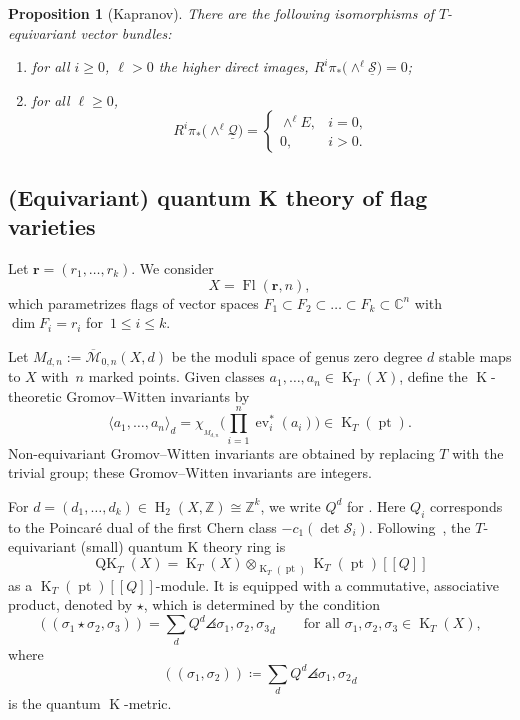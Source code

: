 \documentclass[11pt]{article}
\numberwithin{equation}{section}
\numberwithin{equation}{section}
\newtheorem{Proposition}[Theorem]{Proposition}
\theoremstyle{definition}
\DeclareMathOperator{\Fl}{Fl}
\DeclareMathOperator{\QK}{QK}
\DeclareMathOperator{\K}{K}
\DeclareMathOperator{\HH}{H}
\DeclareMathOperator{\pt}{pt}
\DeclarePairedDelimiter{\angles}{\langle}{\rangle}
\newcommand{\bfr}{{\mathbf r}}
\newcommand{\C}{{\mathbb C}}
\newcommand{\Z}{{\mathbb Z}}
\newcommand{\cQ}{{\mathcal Q}}
\newcommand{\cS}{{\mathcal S}}
\newcommand{\gw}[2]{\angles{ #1 }^{\mbox{}}_{#2}}
\newcommand{\euler}[1]{\chi_{_{#1}}}
\DeclareMathOperator{\ev}{ev}
\newcommand{\wb}{\overline}
\newcommand{\Mb}{\wb{\mathcal M}}
\begin{document}
\begin{Proposition}[Kapranov]\label{prop:relativeBWB}
 There are the following isomorphisms of $T$-equivariant vector bundles:
 \begin{enumerate}\itemsep=0pt
 \item[$(1)$] for all $i \ge 0$, $\ell>0$ the higher direct images, $R^i \pi_* \bigl(\wedge^\ell\underline{\cS}\bigr) = 0$;
 \item[$(2)$] for all $\ell\geq 0$, \[ R^i \pi_*\bigl(\wedge^\ell\underline{\cQ}\bigr) = \begin{cases} \wedge^\ell E, & i=0, \\ 0, & i>0 . \end{cases}\]
 \end{enumerate}
 \end{Proposition}

\subsection{(Equivariant) quantum K theory of flag varieties}\label{sec:prelim}
Let $\mathbf{r}= (r_1, \dots, r_k)$. We consider \[X=\Fl(\bfr,n),\] which parametrizes flags of vector spaces
$F_{1} \subset F_{2} \subset \dots \subset F_{k} \subset \C^n$
with $\dim F_{i} = r_i$ for~${1 \le i \le k}$.

Let $M_{d,n} := \Mb_{0,n}(X,d)$ be the moduli space of genus zero degree
$d$ stable maps to $X$ with~$n$ marked points. Given classes
$a_1, \dots, a_n \in \K_T(X)$,
define the $\K$-theoretic Gromov--Witten invariants by
\[ \langle a_1, \dots, a_n \rangle_{d} =
\euler{M_{d,n}}\Biggl(\prod_{i = 1}^n\ev_i^*(a_i)\Biggr)\in \K_T(\pt) . \]
Non-equivariant Gromov--Witten invariants are obtained by replacing $T$ with the
trivial group; these Gromov--Witten invariants are integers.

For $d=(d_1,\dots,d_k)\in\HH_2(X,\Z)\cong\Z^k$, we write $Q^d$ for . Here $Q_i$ corresponds to the Poincar{\'e} dual of the first Chern class $-c_1(\det \cS_i)$. Following~\cite{givental:onwdvv,lee:QK}, the $T$-equivariant (small) quantum
K theory ring is
\begin{equation*}%
\QK_T(X) = \K_T(X) \otimes_{\K_T(\pt)} \K_T(\pt)[\![Q]\!]
\end{equation*}
as a $\K_T(\pt)[\![Q]\!]$-module.
It is equipped with a commutative, associative
product, denoted by $\star$, which is
determined by the condition
\begin{equation*}%
 (\!(\sigma_1\star\sigma_2,\sigma_3)\!)=\sum_d
 Q^d \gw{\sigma_1,\sigma_2,\sigma_3}{d}\qquad\text{for all $\sigma_1,\sigma_2,\sigma_3\in \K_T(X)$},
\end{equation*}
where
\[
 (\!(\sigma_1,\sigma_2)\!)\coloneqq \sum_{d}Q^d \gw{\sigma_1,\sigma_2}{d}
\]
is the quantum $\K$-metric.
\end{document}
